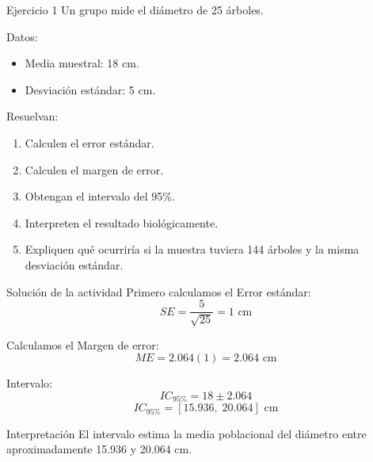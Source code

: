 \documentclass[aspectratio=169,11pt]{beamer}
\begin{document}
\begin{frame}{Ejercicio 1}
Un grupo mide el diámetro de 25 árboles.

Datos:
\begin{itemize}
    \item Media muestral: 18 cm.
    \item Desviación estándar: 5 cm.
\end{itemize}

Resuelvan:
\begin{enumerate}
    \item Calculen el error estándar.
    \item Calculen el margen de error.
    \item Obtengan el intervalo del 95\%.
    \item Interpreten el resultado biológicamente.
    \item Expliquen qué ocurriría si la muestra tuviera
    144 árboles y la misma desviación estándar.
\end{enumerate}
\end{frame}

\begin{frame}{Solución de la actividad}
Primero calculamos el Error estándar:
\vspace{-.2em}
\[
SE=\frac{5}{\sqrt{25}}=1\text{ cm}
\]

Calculamos el Margen de error:
\vspace{-.2em}
\[
ME=2.064(1)=2.064\text{ cm}
\]

Intervalo:
\vspace{-.2em}
\[
IC_{95\%}=18\pm2.064
\]
\vspace{-.2em}
\[
\boxed{IC_{95\%}=[15.936,\;20.064]\text{ cm}}
\]

\begin{block}{Interpretación}
El intervalo estima la media poblacional del diámetro
entre aproximadamente 15.936 y 20.064 cm.
\end{block}
\end{frame}

\end{document}
